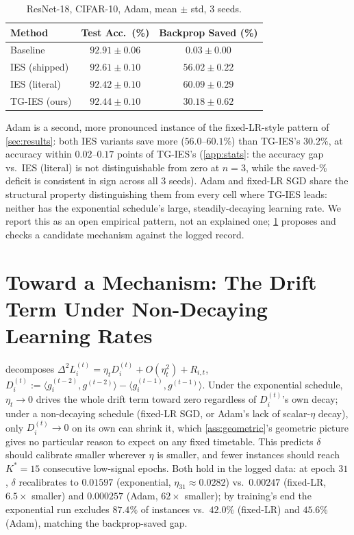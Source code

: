 \documentclass{article}
\newcommand{\lose}[1]{\cellcolor{tglose}#1}
\theoremstyle{plain}
\theoremstyle{definition}
\theoremstyle{remark}
\begin{document}
\begin{table}[h]
\caption{ResNet-18, CIFAR-10, Adam, mean $\pm$ std, 3 seeds.}
\label{tab:adam}
\centering
\small
\begin{tabular}{lcc}
\toprule
Method & Test Acc.\ (\%) & Backprop Saved (\%) \\
\midrule
Baseline & $92.91\pm0.06$ & $0.03\pm0.00$ \\
IES (shipped) & $92.61\pm0.10$ & $56.02\pm0.22$ \\
IES (literal) & $92.42\pm0.10$ & $\mathbf{60.09\pm0.29}$ \\
\lose{TG-IES (ours)} & \lose{$92.44\pm0.10$} & \lose{$30.18\pm0.62$} \\
\bottomrule
\end{tabular}
\end{table}

Adam \citep{kingma2015adam} is a second, more pronounced instance of the fixed-LR-style pattern of \cref{sec:results}: both IES variants save more ($56.0$--$60.1\%$) than TG-IES's $30.2\%$, at accuracy within $0.02$--$0.17$ points of TG-IES's (\cref{app:stats}: the accuracy gap vs.\ IES (literal) is not distinguishable from zero at $n=3$, while the saved-\% deficit is consistent in sign across all 3 seeds). Adam and fixed-LR SGD share the structural property distinguishing them from every cell where TG-IES leads: neither has the exponential schedule's large, steadily-decaying learning rate. We report this as an open empirical pattern, not an explained one; \cref{sec:lrmechanism} proposes and checks a candidate mechanism against the logged record.

\section{Toward a Mechanism: The Drift Term Under Non-Decaying Learning Rates}
\label{sec:lrmechanism}

 decomposes $\Delta^2 L_i^{(t)} = \eta_t D_i^{(t)} + O(\eta_t^2) + R_{i,t}$, $D_i^{(t)} := \langle g_i^{(t-2)},g^{(t-2)}\rangle - \langle g_i^{(t-1)},g^{(t-1)}\rangle$. Under the exponential schedule, $\eta_t\to0$ drives the whole drift term toward zero regardless of $D_i^{(t)}$'s own decay; under a non-decaying schedule (fixed-LR SGD, or Adam's lack of scalar-$\eta$ decay), only $D_i^{(t)}\to0$ on its own can shrink it, which \cref{ass:geometric}'s geometric picture gives no particular reason to expect on any fixed timetable. This predicts $\delta$ should calibrate smaller wherever $\eta$ is smaller, and fewer instances should reach $K^*{=}15$ consecutive low-signal epochs. Both hold in the logged data: at epoch $31$, $\delta$ recalibrates to $0.01597$ (exponential, $\eta_{31}{\approx}0.0282$) vs.\ $0.00247$ (fixed-LR, $6.5\times$ smaller) and $0.000257$ (Adam, $62\times$ smaller); by training's end the exponential run excludes $87.4\%$ of instances vs.\ $42.0\%$ (fixed-LR) and $45.6\%$ (Adam), matching the backprop-saved gap.
\end{document}

